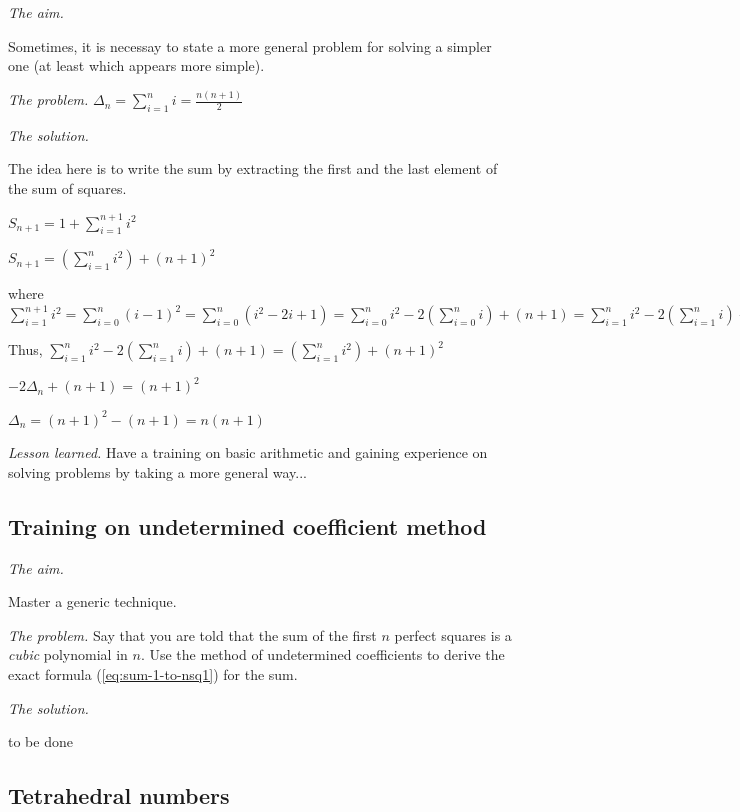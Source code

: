 \noindent \textit{The aim.}

Sometimes, it is necessay to state a more general problem for solving a simpler one (at least which appears more simple).
\medskip

\noindent \textit{The problem.}
$\Delta_n = \sum_{i=1}^{n} i = \frac{n(n+1)}{2}$
\medskip

\noindent \textit{The solution.}

The idea here is to write the sum by extracting the first and the last element
of the sum of squares.
\medskip

$S_{n+1} = 1 + \sum_{i=1}^{n+1} i^2$

$S_{n+1} = (\sum_{i=1}^{n} i^2) + (n+1)^2$

where $\sum_{i=1}^{n+1} i^2 
= \sum_{i=0}^{n} (i-1)^2 
= \sum_{i=0}^{n} (i^2-2i+1) 
= \sum_{i=0}^{n} i^2- 2 ( \sum_{i=0}^{n} i) + (n+1)
= \sum_{i=1}^{n} i^2- 2 ( \sum_{i=1}^{n} i) + (n+1)$

Thus, 
$\sum_{i=1}^{n} i^2- 2 ( \sum_{i=1}^{n} i) + (n+1) = (\sum_{i=1}^{n} i^2) + (n+1)^2$

$-2 \Delta_n + (n+1) =  (n+1)^2$

$\Delta_n =  (n+1)^2-(n+1) = n(n+1)$
\medskip

\noindent \textit{Lesson learned.}
Have a training on basic arithmetic and gaining experience on solving problems 
by taking a more general way...


\subsection{Training on undetermined coefficient method}

\noindent \textit{The aim.}

Master a generic technique.
\medskip

\noindent \textit{The problem.}
Say that you are told that the sum of the first $n$ perfect squares is
a {\em cubic} polynomial in $n$.  Use the method of undetermined
coefficients to derive the exact formula (\ref{eq:sum-1-to-nsq1}) for
the sum.
\medskip

\noindent \textit{The solution.}

to be done


\subsection{Tetrahedral numbers}


